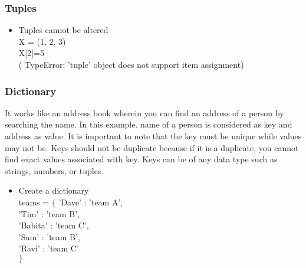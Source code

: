 \documentclass{beamer}
\theoremstyle{plain}
\theoremstyle{definition}
\begin{document}
\begin{frame}
      \frametitle{Tuples}
      
	\begin{itemize}
			\item Tuples cannot be altered \\
			 X = (1, 2, 3) \\
             X[2]=5 \\
            ( TypeError: 'tuple' object does not support item assignment)             
             
			\end{itemize}
			

\end{frame}

\begin{frame}
      \frametitle{Dictionary}
      It works like an address book wherein you can find an address of a person by searching the name. In this example. name of a person is considered as key and address as value. It is important to note that the key must be unique while values may not be. Keys should not be duplicate because if it is a duplicate, you cannot find exact values associated with key. Keys can be of any data type such as strings, numbers, or tuples.
\begin{itemize}
			\item Create a dictionary \\
			     teams = $\lbrace$ 'Dave' : 'team A',\\
             'Tim' : 'team B',\\
             'Babita' : 'team C',\\
             'Sam' : 'team B',\\
             'Ravi' : 'team C' \\
            $\rbrace$
            \end{itemize}
			

\end{frame}
\end{document}
